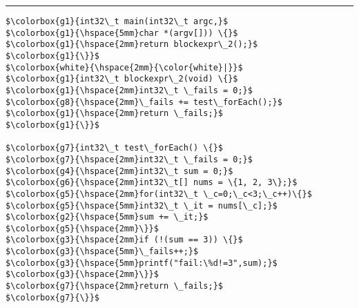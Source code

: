 \hfill 
\rule[-67ex]{0.2ex}{30.2em}
\begin{minipage}[t]{130pt} 
\begin{lstlisting}[language=mbeddr]
$\colorbox{g1}{int32\_t main(int32\_t argc,}$
$\colorbox{g1}{\hspace{5mm}char *(argv[])) \{}$
$\colorbox{g1}{\hspace{2mm}return blockexpr\_2();}$
$\colorbox{g1}{\}}$  
$\colorbox{white}{\hspace{2mm}{\color{white}|}}$
$\colorbox{g1}{int32\_t blockexpr\_2(void) \{}$
$\colorbox{g1}{\hspace{2mm}int32\_t \_fails = 0;}$
$\colorbox{g8}{\hspace{2mm}\_fails += test\_forEach();}$
$\colorbox{g1}{\hspace{2mm}return \_fails;}$
$\colorbox{g1}{\}}$

$\colorbox{g7}{int32\_t test\_forEach() \{}$
$\colorbox{g7}{\hspace{2mm}int32\_t \_fails = 0;}$
$\colorbox{g4}{\hspace{2mm}int32\_t sum = 0;}$
$\colorbox{g6}{\hspace{2mm}int32\_t[] nums = \{1, 2, 3\};}$
$\colorbox{g5}{\hspace{2mm}for(int32\_t \_c=0;\_c<3;\_c++)\{}$
$\colorbox{g5}{\hspace{5mm}int32\_t \_it = nums[\_c];}$
$\colorbox{g2}{\hspace{5mm}sum += \_it;}$
$\colorbox{g5}{\hspace{2mm}\}}$
$\colorbox{g3}{\hspace{2mm}if (!(sum == 3)) \{}$
$\colorbox{g3}{\hspace{5mm}\_fails++;}$
$\colorbox{g3}{\hspace{5mm}printf("fail:\%d!=3",sum);}$
$\colorbox{g3}{\hspace{2mm}\}}$
$\colorbox{g7}{\hspace{2mm}return \_fails;}$
$\colorbox{g7}{\}}$
\end{lstlisting}
\end{minipage} 
\begin{lstlisting}[caption=Example mbeddr program with foreach and unit test
(left column) and generated C code (right column),
language=mbeddr,label=lst:generatedForEach]
\end{lstlisting}

